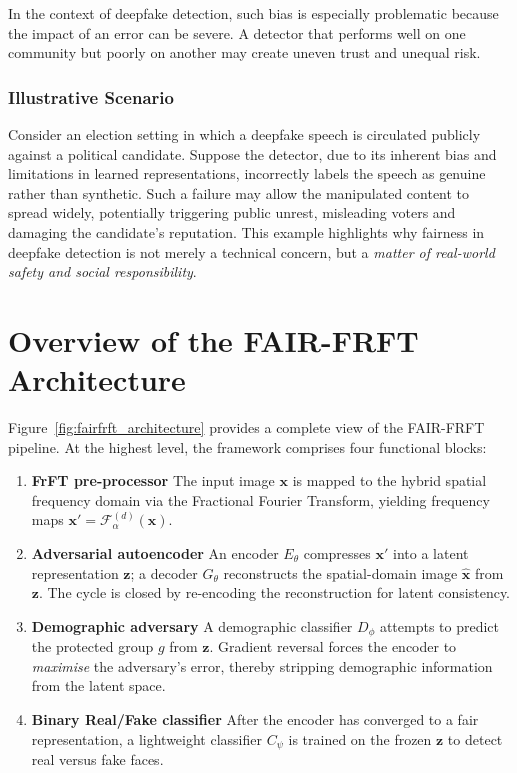 In the context of deepfake detection, such bias is especially problematic because the impact of an error can be severe. A detector that performs well on one community but poorly on another may create uneven trust and unequal risk. 

\subsubsection{Illustrative Scenario}
\label{subsec:problem_example}

Consider an election setting in which a deepfake speech is circulated
publicly against a political candidate. Suppose the detector, due to its inherent bias and limitations in learned representations, incorrectly labels the speech as genuine rather than synthetic. Such a failure may allow the manipulated content to spread widely, potentially triggering public unrest, misleading voters and damaging the candidate's reputation. This example highlights why fairness in deepfake detection is not merely a technical concern, but a \emph{matter of real-world safety and social responsibility}.
 
\section{Overview of the FAIR-FRFT Architecture}
\label{sec:architecture_overview}
 
Figure~\ref{fig:fairfrft_architecture} provides a complete view of the
FAIR-FRFT pipeline.  At the highest level, the framework comprises
four functional blocks:
 
\begin{enumerate}
  \item \textbf{FrFT pre-processor}  The input image $\mathbf{x}$
        is mapped to the hybrid spatial frequency domain via the
        Fractional Fourier Transform, yielding frequency maps
        $\mathbf{x}' = \mathcal{F}_\alpha^{(d)}(\mathbf{x})$.
  \item \textbf{Adversarial autoencoder}  An encoder
        $E_\theta$ compresses $\mathbf{x}'$ into a latent
        representation $\mathbf{z}$; a decoder $G_\theta$
        reconstructs the spatial-domain image $\hat{\mathbf{x}}$
        from $\mathbf{z}$.  The cycle is closed by re-encoding the
        reconstruction for latent consistency.
  \item \textbf{Demographic adversary}  A demographic classifier
        $D_\phi$ attempts to predict the protected group $g$ from
        $\mathbf{z}$.  Gradient reversal forces the encoder to
        \emph{maximise} the adversary's error, thereby stripping
        demographic information from the latent space.
  \item \textbf{Binary Real/Fake classifier}  After the encoder has
        converged to a fair representation, a lightweight
        classifier $C_\psi$ is trained on the frozen $\mathbf{z}$
        to detect real versus fake faces.
\end{enumerate}
 
